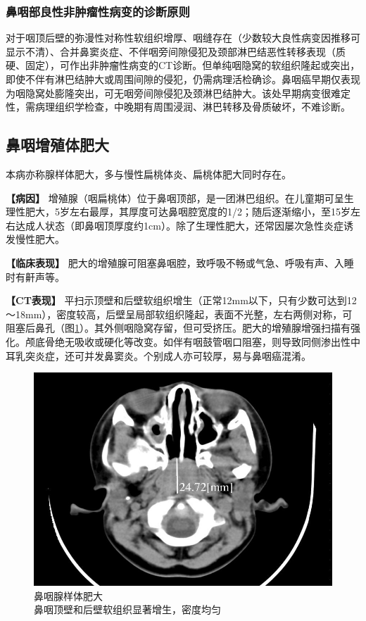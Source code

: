 \subsubsection{鼻咽部良性非肿瘤性病变的诊断原则}

对于咽顶后壁的弥漫性对称性软组织增厚、咽缝存在（少数较大良性病变因推移可显示不清）、合并鼻窦炎症、不伴咽旁间隙侵犯及颈部淋巴结恶性转移表现（质硬、固定），可作出非肿瘤性病变的CT诊断。但单纯咽隐窝的软组织隆起或突出，即使不伴有淋巴结肿大或周围间隙的侵犯，仍需病理活检确诊。鼻咽癌早期仅表现为咽隐窝处膨隆突出，可无咽旁间隙侵犯及颈淋巴结肿大。该处早期病变很难定性，需病理组织学检查，中晚期有周围浸润、淋巴转移及骨质破坏，不难诊断。

\subsection{鼻咽增殖体肥大}

本病亦称腺样体肥大，多与慢性扁桃体炎、扁桃体肥大同时存在。

\textbf{【病因】}
增殖腺（咽扁桃体）位于鼻咽顶部，是一团淋巴组织。在儿童期可呈生理性肥大，5岁左右最厚，其厚度可达鼻咽腔宽度的1/2；随后逐渐缩小，至15岁左右达成人状态（即鼻咽顶厚度约1cm）。除了生理性肥大，还常因屡次急性炎症诱发慢性肥大。

\textbf{【临床表现】}
肥大的增殖腺可阻塞鼻咽腔，致呼吸不畅或气急、呼吸有声、入睡时有鼾声等。

\textbf{【CT表现】}
平扫示顶壁和后壁软组织增生（正常12mm以下，只有少数可达到12～18mm），密度较高，后壁呈局部软组织隆起，表面不光整，左右两侧对称，可阻塞后鼻孔（图\ref{fig6-5}）。其外侧咽隐窝存留，但可受挤压。肥大的增殖腺增强扫描有强化。颅底骨绝无吸收或硬化等改变。如伴有咽鼓管咽口阻塞，则导致同侧渗出性中耳乳突炎症，还可并发鼻窦炎。个别成人亦可较厚，易与鼻咽癌混淆。

\begin{figure}[!htbp]
 \centering
 \includegraphics[width=.7\textwidth,height=\textheight,keepaspectratio]{./images/Image00142.jpg}
 \captionsetup{justification=centering}
 \caption{鼻咽腺样体肥大\\{\small 鼻咽顶壁和后壁软组织显著增生，密度均匀}}
 \label{fig6-5}
  \end{figure} 

